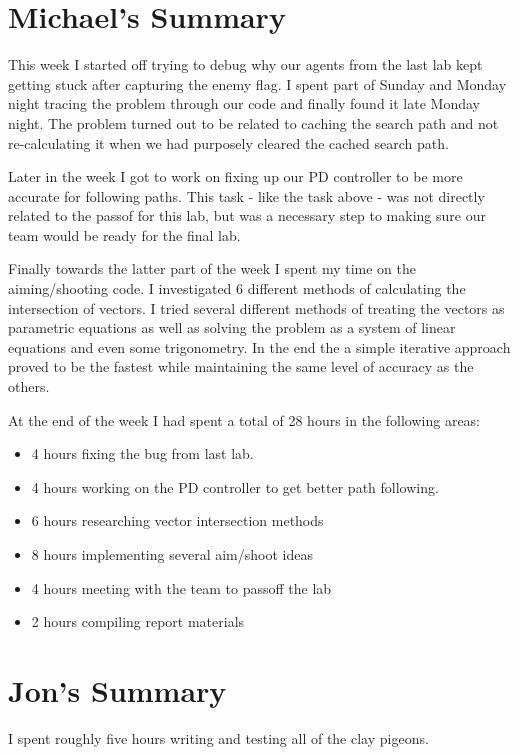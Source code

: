 \section{Michael's Summary}
This week I started off trying to debug why our agents from the last lab kept getting stuck after capturing the enemy flag. I spent part of Sunday and Monday night tracing the problem through our code
and finally found it late Monday night.  The problem turned out to be related to caching the search path
and not re-calculating it when we had purposely cleared the cached search path.
\par
Later in the week I got to work on fixing up our PD controller to be more accurate for following paths.  This task - like the task above - was not directly related to the passof for this lab, but was a necessary step to making sure our team would be ready for the final lab.
\par
Finally towards the latter part of the week I spent my time on the aiming/shooting code.  I investigated 6 different methods of calculating the intersection of vectors.  I tried several different methods of treating the vectors as parametric equations as well as solving the problem as a system of linear equations and even some trigonometry.  In the end the a simple iterative approach proved to be the fastest while maintaining the same level of accuracy as the others.
\par
At the end of the week I had spent a total of 28 hours in the following areas:
\begin{itemize}
    \item 4 hours fixing the bug from last lab.
    \item 4 hours working on the PD controller to get better path following.
    \item 6 hours researching vector intersection methods
    \item 8 hours implementing several aim/shoot ideas
    \item 4 hours meeting with the team to passoff the lab
    \item 2 hours compiling report materials
\end{itemize}

\section{Jon's Summary}
I spent roughly five hours writing and testing all of the clay pigeons.